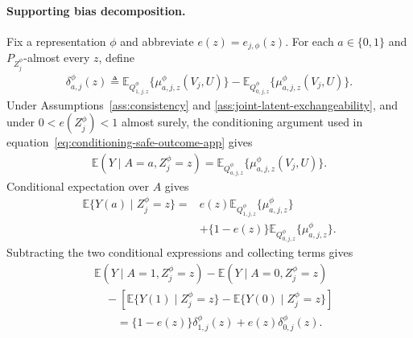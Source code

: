 \paragraph{Supporting bias decomposition.}
Fix a representation $\phi$ and abbreviate $e(z)=e_{j,\phi}(z)$. For each $a\in\{0,1\}$ and $P_{Z_j^\phi}$-almost every $z$, define
\begin{align}
\delta_{a,j}^{\phi}(z)
\triangleq
\mathbb E_{Q_{1,j,z}^{\phi}}\{\mu_{a,j,z}^{\phi}(V_j,U)\}
-
\mathbb E_{Q_{0,j,z}^{\phi}}\{\mu_{a,j,z}^{\phi}(V_j,U)\}.
\label{eq:stratum-mass-propensity}
\end{align}
Under Assumptions~\ref{ass:consistency} and \ref{ass:joint-latent-exchangeability}, and under $0<e(Z_j^\phi)<1$ almost surely, the conditioning argument used in equation~\eqref{eq:conditioning-safe-outcome-app} gives
\begin{align}
\mathbb E(Y\mid A=a,Z_j^\phi=z)
=
\mathbb E_{Q_{a,j,z}^{\phi}}\{\mu_{a,j,z}^{\phi}(V_j,U)\}.
\label{eq:observed-arm-mean}
\end{align}
Conditional expectation over $A$ gives
\begin{align}
\mathbb E\{Y(a)\mid Z_j^\phi=z\}
={}&
e(z)\mathbb E_{Q_{1,j,z}^{\phi}}\{\mu_{a,j,z}^{\phi}\}
\nonumber\\
&+\{1-e(z)\}\mathbb E_{Q_{0,j,z}^{\phi}}\{\mu_{a,j,z}^{\phi}\}.
\label{eq:potential-arm-mixture}
\end{align}
Subtracting the two conditional expressions and collecting terms gives
\begin{align}
&\mathbb E(Y\mid A=1,Z_j^\phi=z)
-\mathbb E(Y\mid A=0,Z_j^\phi=z)
\nonumber\\
&\quad-
\left[
\mathbb E\{Y(1)\mid Z_j^\phi=z\}
-
\mathbb E\{Y(0)\mid Z_j^\phi=z\}
\right]
\nonumber\\
&\qquad=
\{1-e(z)\}\delta_{1,j}^{\phi}(z)
+e(z)\delta_{0,j}^{\phi}(z).
\label{eq:pointwise-bias-decomposition}
\end{align}

